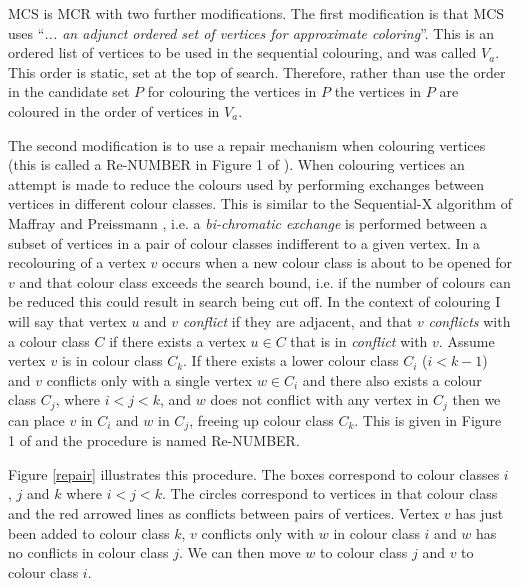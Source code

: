 \documentclass{l4proj}
\begin{document}
MCS \cite{tomita2010} is MCR with two further modifications. 
The first modification is that MCS uses 
``\emph{... an adjunct ordered set of vertices for approximate coloring}''. This is an ordered list of vertices to
be used in the sequential colouring, and was called $V_{a}$. This order is static, set at the top of search. 
Therefore, rather than use the order in the candidate set $P$ for colouring the vertices in $P$ the
vertices in $P$ are coloured in the order of vertices in $V_{a}$.

The second modification is to use a repair mechanism when
colouring vertices (this is called a Re-NUMBER in Figure 1 of \cite{tomita2010}). When colouring vertices
an attempt is made to reduce the colours used by performing exchanges between vertices in
different colour classes. This is similar to the Sequential-X algorithm of Maffray and Preissmann
\cite{maffray1999}, i.e. a \emph{bi-chromatic exchange} is performed between a subset of vertices
in a pair of colour classes indifferent to a given vertex. In \cite{tomita2010} a recolouring of a vertex
$v$ occurs when a new colour class is about to be opened for $v$ and that colour class exceeds the search bound, i.e.
if the number of colours can be reduced this could result in search being cut off. 
In the context of colouring I will say that vertex $u$ and $v$ \emph{conflict} if they are adjacent, and that $v$ \emph{conflicts} with a colour 
class $C$ if there exists a vertex $u \in C$ that is in \emph{conflict} with $v$.
Assume vertex $v$ is in colour class $C_k$. If there exists a lower colour class $C_i$ ($i < k-1$) and $v$ conflicts only with a 
single vertex $w \in C_{i}$ and
there also exists a colour class $C_j$, where $i < j < k$, and $w$ does not conflict with any vertex in $C_j$ then we can
place $v$ in $C_i$ and $w$ in $C_j$, freeing up colour class $C_k$. This is given in Figure 1 of \cite{tomita2010} and 
the procedure is named Re-NUMBER. 

Figure \ref{repair} illustrates this procedure. The boxes correspond to colour classes $i$, $j$ and $k$ where $i < j < k$. The circles
correspond to vertices in that colour class and the red arrowed lines as conflicts between pairs of vertices. Vertex $v$ has just been
added to colour class $k$, $v$ conflicts only with $w$ in colour class $i$ and $w$ has no conflicts in colour class $j$. We can then move 
$w$ to colour class $j$ and $v$ to colour class $i$.
\end{document}
